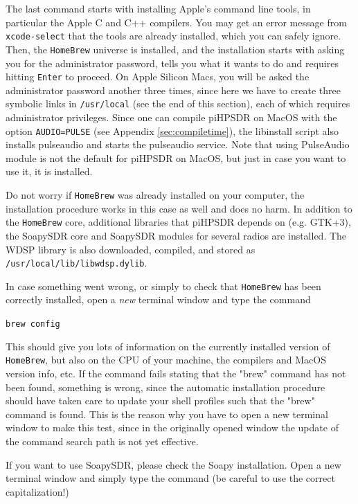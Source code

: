 \documentclass[12pt]{book}
\def\grtt#1{\texttt{\color{magenta}#1}}
\begin{document}
The last command starts with installing Apple's command line tools, in particular the Apple C and C++
compilers. You may get an error message from \texttt{xcode-select} that the tools are already
installed, which you can safely ignore. Then, the
 \texttt{HomeBrew} universe is installed, and the installation starts with asking you for the administrator
 password, tells you what it wants to do and requires hitting \texttt{Enter} to proceed.
 On Apple Silicon Macs, you will be asked the administrator password another three times,
 since here we have to create three symbolic links in \texttt{/usr/local} (see the end of this section),
 each of which requires administrator privileges. Since one can compile piHPSDR on MacOS with
 the option \texttt{AUDIO=PULSE} (see Appendix \ref{sec:compiletime}), the libinstall script
 also installs pulseaudio and starts the pulseaudio service. Note that using  PulseAudio
 module is not the default for piHPSDR on MacOS, but just in case you want to use it, it is
 installed.
 
Do not worry if \texttt{HomeBrew} was already installed on your computer, the installation
procedure works in this case as well and does no harm. In addition to
 the \texttt{HomeBrew} core, additional libraries that piHPSDR depends on (e.g. GTK+3), the SoapySDR
 core and SoapySDR modules for several radios are installed. The WDSP library is also downloaded,
 compiled, and stored as \texttt{/usr/local/lib/libwdsp.dylib}.
 
 In case something went wrong, or simply to check that \texttt{HomeBrew} has been correctly installed,
 open a \textit{new} terminal window and type the command
 
 
\grtt{brew config}
 
 This should give you lots of information on the currently installed version of \texttt{HomeBrew},
 but also on the CPU of your machine, the compilers and MacOS version info, etc. If the command
 fails stating that the "brew" command has not been found, something is wrong, since the automatic
 installation procedure should have taken care to update your shell profiles such that the "brew"
 command is found. This is the reason why you have to open a new terminal window to make this test,
 since in the originally opened window the update of the command search path is not yet effective.
 
 If you want to use SoapySDR, please check the Soapy installation. Open a new terminal window and simply
 type the command (be careful to use the correct capitalization!)
\end{document}
